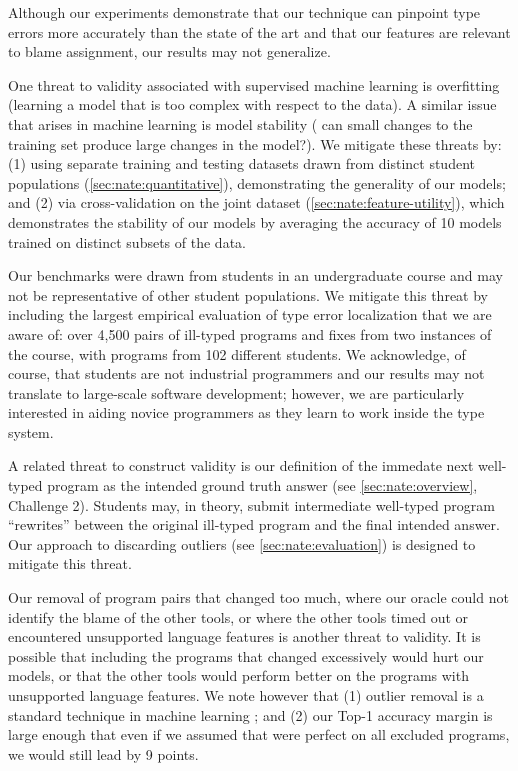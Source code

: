 \label{sec:nate:validity}

Although our experiments demonstrate that our technique can pinpoint type
errors more accurately than the state of the art and that our features are
relevant to blame assignment, our results may not generalize.

One threat to validity associated with supervised machine learning is
overfitting (\ie learning a model that is too complex with respect to
the data).
%
A similar issue that arises in machine learning is model stability (\ie
can small changes to the training set produce large changes in the model?).
%
We mitigate these threats by:
%
(1) using separate training and testing datasets drawn from distinct
student populations (\autoref{sec:nate:quantitative}), demonstrating the
generality of our models; and
%
(2) via cross-validation on the joint dataset
(\autoref{sec:nate:feature-utility}), which demonstrates the stability of our
models by averaging the accuracy of 10 models trained on distinct
subsets of the data.

Our benchmarks were drawn from students in an undergraduate course and
may not be representative of other student populations.
%
We mitigate this threat by including the largest empirical evaluation of
type error localization that we are aware of: over 4,500 pairs of
ill-typed programs and fixes from two instances of the course, with
programs from 102 different students.
%
We acknowledge, of course, that students are not industrial programmers
and our results may not translate to large-scale software development;
however, we are particularly interested in aiding novice programmers
as they learn to work inside the type system.

A related threat to construct validity is our definition of the immedate
next well-typed program as the intended ground truth answer (see
\autoref{sec:nate:overview}, Challenge 2). Students may, in theory, submit
intermediate well-typed program ``rewrites'' between the original ill-typed
program and the final intended answer. Our approach to discarding outliers
(see \autoref{sec:nate:evaluation}) is designed to mitigate this threat.

Our removal of program pairs that changed too much, where our oracle
could not identify the blame of the other tools, or where the other
tools timed out or encountered unsupported language features is another
threat to validity.
%
It is possible that including the programs that changed excessively
would hurt our models, or that the other tools would perform
better on the programs with unsupported language features.
%
We note however that
%
(1) outlier removal is a standard technique in machine learning%
; and
%
(2) our Top-1 accuracy margin is large enough that even if we assumed
that \sherrloc were perfect on all excluded programs,
we would still lead by 9 points.
%

